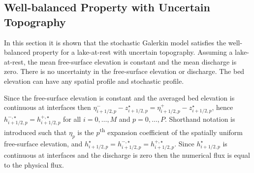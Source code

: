 \subsection{Well-balanced Property with Uncertain Topography}

In this section it is shown that the stochastic Galerkin model satisfies the well-balanced property for a lake-at-rest with uncertain topography.
Assuming a lake-at-rest, the mean free-surface elevation is constant and the mean discharge is zero.
There is no uncertainty in the free-surface elevation or discharge.
The bed elevation can have any spatial profile and stochastic profile.

Since the free-surface elevation is constant and the averaged bed elevation is continuous at interfaces then $\eta_{i+1/2,p}^- - z^\star_{i+1/2,p} = \eta_{i+1/2,p}^+ - z^\star_{i+1/2,p}$, hence $h^{-,\star}_{i+1/2,p} = h^{+,\star}_{i+1/2,p}$ for all $i = 0, \ldots, M$ and $p = 0, \ldots, P$.
Shorthand notation is introduced such that
$\eta_p$ is the $p$\textsuperscript{th} expansion coefficient of the spatially uniform free-surface elevation, and
$h^\star_{i+1/2,p} = h^{-,\star}_{i+1/2,p} = h^{+,\star}_{i+1/2,p}$.
Since $h^\star_{i+1/2,p}$ is continuous at interfaces and the discharge is zero then the numerical flux is equal to the physical flux.

